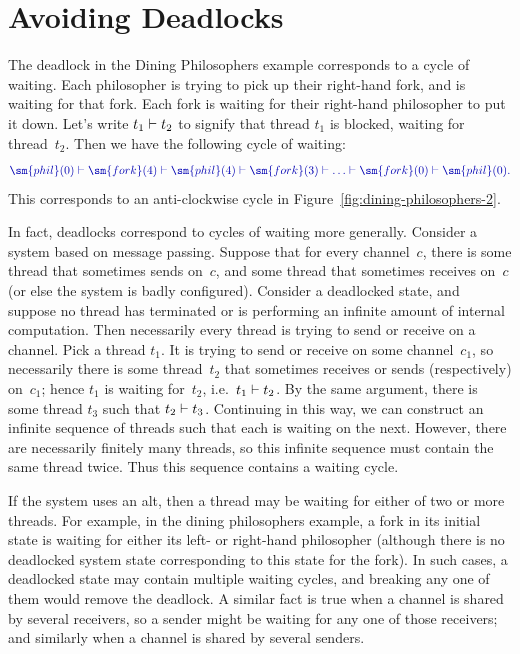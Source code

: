 \section{Avoiding Deadlocks}
\label{sec:avoid-deadlocks}

The deadlock in the Dining Philosophers example corresponds to
a cycle of waiting.  Each philosopher is trying to pick up their right-hand
fork, and is waiting for that fork.  Each fork is waiting for their right-hand
philosopher to put it down.  Let's write $t_1 \vdash t_2$ to signify that
thread $t_1$ is blocked, waiting for thread~$t_2$.  Then we have the following
cycle of waiting:
\[\mstyle
\sm{phil}(0) \waitingFor \sm{fork}(4) \waitingFor \sm{phil}(4) \waitingFor
  \sm{fork}(3) \waitingFor \ldots \waitingFor \sm{fork}(0) \waitingFor
  \sm{phil}(0).
\]
This corresponds to an anti-clockwise cycle in
Figure~\ref{fig:dining-philosophers-2}.

In fact, deadlocks correspond to cycles of waiting more generally.  Consider a
system based on message passing.  Suppose that for every channel~$c$, there is
some thread that sometimes sends on~$c$, and some thread that sometimes
receives on~$c$ (or else the system is badly configured).  Consider a
deadlocked state, and suppose no thread has terminated or is performing an
infinite amount of internal computation.  Then necessarily every thread is
trying to send or receive on a channel.  Pick a thread $t_1$.  It is trying to
send or receive on some channel~$c_1$, so necessarily there is some
thread~$t_2$ that sometimes receives or sends (respectively) on~$c_1$; hence
$t_1$ is waiting for~$t_2$, i.e.~$t_1 \vdash t_2$.  By the same argument,
there is some thread $t_3$ such that $t_2 \vdash t_3$.  Continuing in
this way, we can construct an infinite sequence of threads such that each is
waiting on the next.  However, there are necessarily finitely many threads, so
this infinite sequence must contain the same thread twice.  Thus this sequence
contains a waiting cycle.

If the system uses an alt, then a thread may be waiting for either of two or
more threads.  For example, in the dining philosophers example, a fork in its
initial state is waiting for either its left- or right-hand philosopher
(although there is no deadlocked system state corresponding to this state for
the fork).  In such cases, a deadlocked state may contain multiple waiting
cycles, and breaking any one of them would remove the deadlock.  A similar
fact is true when a channel is shared by several receivers, so a sender might
be waiting for any one of those receivers; and similarly when a channel is
shared by several senders.

